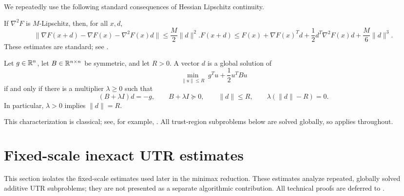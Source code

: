 \documentclass{article}
\begin{document}
We repeatedly use the following standard consequences of Hessian
Lipschitz continuity.

\begin{lemma}\label{lem:taylor-bounds}
If $\nabla^2F$ is $M$-Lipschitz, then, for all $x,d$,
\begin{subequations}\label{eq:taylor-bounds}
\begin{equation}\label{eq:gradient-taylor}
 \bigl\|\nabla F(x+d)-\nabla F(x)-\nabla^2F(x)d\bigr\|
 \le \frac M2\|d\|^2.
\end{equation}
\begin{equation}\label{eq:function-taylor}
 F(x+d)\le{}F(x)+\nabla F(x)^Td
 +\frac12d^T\nabla^2F(x)d+\frac M6\|d\|^3.
\end{equation}
\end{subequations}
These estimates are standard; see
\citet[Lemma~1.2.4]{nesterov2004introductory}.
\end{lemma}

\begin{lemma}
\label{lem:tr-global-optimality}
Let $g\in\mathbb{R}^n$, let $B\in\mathbb{R}^{n\times n}$ be symmetric, and let
$R>0$.  A vector $d$ is a global solution of
\[
 \min_{\|u\|\le R}\;g^Tu+\frac12u^TBu
\]
if and only if there is a multiplier $\lambda\ge0$ such that
\begin{equation}\label{eq:tr-global-optimality}
 (B+\lambda I)d=-g,\qquad
 B+\lambda I\succeq0,\qquad
 \|d\|\le R,\qquad
 \lambda(\|d\|-R)=0.
\end{equation}
In particular, $\lambda>0$ implies $\|d\|=R$.
\end{lemma}

This characterization is classical; see, for example,
\citet[Section~8.7]{luenberger2021linear}.  All trust-region
subproblems below are solved globally, so
 applies throughout.


\section{Fixed-scale inexact UTR estimates}
\label{sec:generic-utr}
This section isolates the fixed-scale estimates used later in the
minimax reduction.  These estimates analyze repeated, globally solved
additive UTR subproblems; they are not presented as a separate
algorithmic contribution.  All technical proofs are deferred to
.
\end{document}
